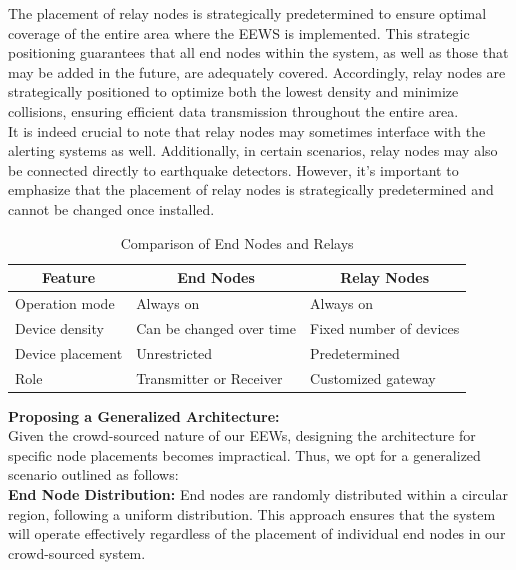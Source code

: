 The placement of relay nodes is strategically predetermined to ensure optimal coverage of the entire area where the EEWS is implemented. This strategic positioning guarantees that all end nodes within the system, as well as those that may be added in the future, are adequately covered. Accordingly, relay nodes are strategically positioned to optimize both the lowest density and minimize collisions, ensuring efficient data transmission throughout the entire area.\\

It is indeed crucial to note that relay nodes may sometimes interface with the alerting systems as well. Additionally, in certain scenarios, relay nodes may also be connected directly to earthquake detectors. However, it's important to emphasize that the placement of relay nodes is strategically predetermined and cannot be changed once installed.

\begin{table}[htp!]
\begin{tabular}{|l|l|l|}
\hline
\multicolumn{1}{|c|}{Feature} & \multicolumn{1}{c|}{End Nodes} & \multicolumn{1}{c|}{Relay Nodes} \\ \hline
Operation mode   & Always on               & Always on          \\ \hline
Device density                & Can be changed over time       & Fixed number of devices          \\ \hline
Device placement & Unrestricted            & Predetermined       \\ \hline
Role             & Transmitter or Receiver & Customized gateway \\ \hline
\end{tabular}%
\caption{Comparison of End Nodes and Relays}
\label{tab:comparison_of_devices}
\end{table}

\noindent\textbf{Proposing a Generalized Architecture:}\\

Given the crowd-sourced nature of our \ac{EEWs}, designing the architecture for specific node placements becomes impractical. Thus, we opt for a generalized scenario outlined as follows:\\

\noindent\textbf{End Node Distribution:} End nodes are randomly distributed within a circular region, following a uniform distribution. This approach ensures that the system will operate effectively regardless of the placement of individual end nodes in our crowd-sourced system.\\

